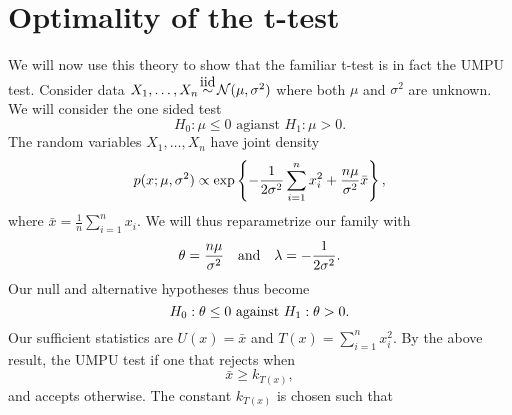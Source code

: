\section{Optimality of the t-test}
We will now use this theory to show that the familiar t-test is in fact the UMPU test. Consider data $X_1,\ldots, X_n \iid \Na(\mu,\sigma^2)$ where both $\mu$ and $\sigma^2$ are unknown. We will consider the one sided test
\[H_0 : \mu \le 0 \text{ agianst } H_1 : \mu > 0.\]  
The random variables $X_1,\ldots, X_n$ have joint density
\[p(x;\mu,\sigma^2) \propto \exp\left\{-\frac{1}{2\sigma^2}\sum_{i=1}^n x_i^2 +\frac{n\mu}{\sigma^2}\bar{x}\right\}, \]
where $\bar{x} = \frac{1}{n}\sum_{i=1}^n x_i$. We will thus reparametrize our family with 
\[{\theta} = \frac{n\mu}{\sigma^2} ~~~\text{and}~~~\lambda=-\frac{1}{2\sigma^2}. \]
Our null and alternative hypotheses thus become 
\[H_0: {\theta} \le 0 \text{ against } H_1 : {\theta} > 0.\]
Our sufficient statistics are $U(x) = \bar{x}$ and $T(x) = \sum_{i=1}^n x_i^2$. By the above result, the UMPU test if one that rejects when 
\[\bar{x} \ge k_{T(x)}, \]
and accepts otherwise. The constant $k_{T(x)}$ is chosen such that 

